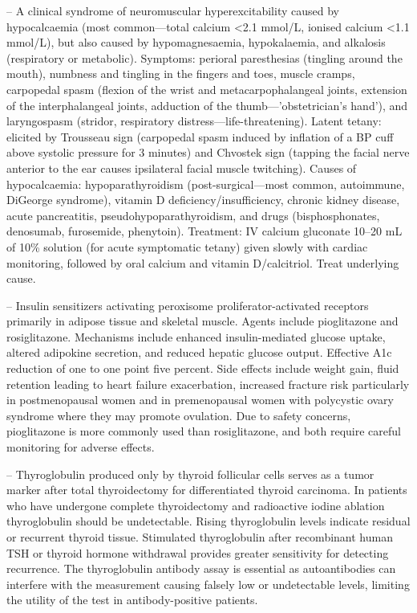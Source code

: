 -- A clinical syndrome of neuromuscular hyperexcitability caused by hypocalcaemia (most common—total calcium <2.1 mmol/L, ionised calcium <1.1 mmol/L), but also caused by hypomagnesaemia, hypokalaemia, and alkalosis (respiratory or metabolic). Symptoms: perioral paresthesias (tingling around the mouth), numbness and tingling in the fingers and toes, muscle cramps, carpopedal spasm (flexion of the wrist and metacarpophalangeal joints, extension of the interphalangeal joints, adduction of the thumb—'obstetrician's hand'), and laryngospasm (stridor, respiratory distress—life-threatening). Latent tetany: elicited by Trousseau sign (carpopedal spasm induced by inflation of a BP cuff above systolic pressure for 3 minutes) and Chvostek sign (tapping the facial nerve anterior to the ear causes ipsilateral facial muscle twitching). Causes of hypocalcaemia: hypoparathyroidism (post-surgical—most common, autoimmune, DiGeorge syndrome), vitamin D deficiency/insufficiency, chronic kidney disease, acute pancreatitis, pseudohypoparathyroidism, and drugs (bisphosphonates, denosumab, furosemide, phenytoin). Treatment: IV calcium gluconate 10--20 mL of 10\% solution (for acute symptomatic tetany) given slowly with cardiac monitoring, followed by oral calcium and vitamin D/calcitriol. Treat underlying cause.

-- Insulin sensitizers activating peroxisome proliferator-activated receptors primarily in adipose tissue and skeletal muscle. Agents include pioglitazone and rosiglitazone. Mechanisms include enhanced insulin-mediated glucose uptake, altered adipokine secretion, and reduced hepatic glucose output. Effective A1c reduction of one to one point five percent. Side effects include weight gain, fluid retention leading to heart failure exacerbation, increased fracture risk particularly in postmenopausal women and in premenopausal women with polycystic ovary syndrome where they may promote ovulation. Due to safety concerns, pioglitazone is more commonly used than rosiglitazone, and both require careful monitoring for adverse effects.

-- Thyroglobulin produced only by thyroid follicular cells serves as a tumor marker after total thyroidectomy for differentiated thyroid carcinoma. In patients who have undergone complete thyroidectomy and radioactive iodine ablation thyroglobulin should be undetectable. Rising thyroglobulin levels indicate residual or recurrent thyroid tissue. Stimulated thyroglobulin after recombinant human TSH or thyroid hormone withdrawal provides greater sensitivity for detecting recurrence. The thyroglobulin antibody assay is essential as autoantibodies can interfere with the measurement causing falsely low or undetectable levels, limiting the utility of the test in antibody-positive patients.

